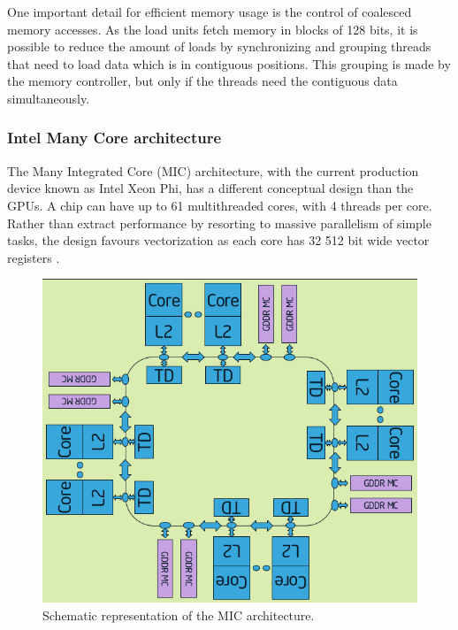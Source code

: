 One important detail for efficient memory usage is the control of coalesced memory accesses. As the load units fetch memory in blocks of 128 bits, it is possible to reduce the amount of loads by synchronizing and grouping threads that need to load data which is in contiguous positions. This grouping is made by the memory controller, but only if the threads need the contiguous data simultaneously.

\subsubsection*{Intel Many Core architecture}
\label{MIC}

The \intel Many Integrated Core (MIC) architecture, with the current production device known as Intel Xeon Phi, has a different conceptual design than the \nvidia GPUs. A chip can have up to 61 multithreaded cores, with 4 threads per core. Rather than extract performance by resorting to massive parallelism of simple tasks, the design favours vectorization as each core has 32 512 bit wide vector registers \cite{Intel:MIC}.

\begin{figure}[!htp]
	\begin{center}
		\includegraphics[scale=0.5]{../../common/img/mic_arch.png}
		\caption{Schematic representation of the \intel MIC architecture.}
		\label{fig:MICArchitecture}
	\end{center}
\end{figure}

